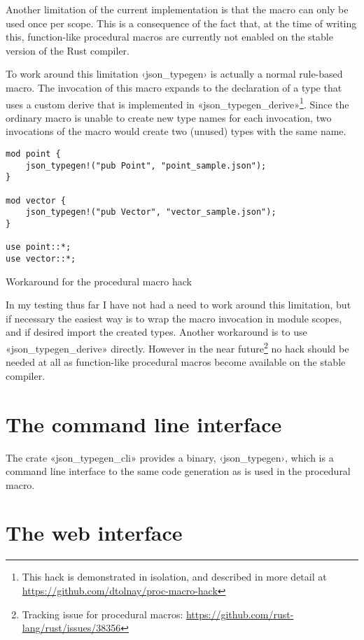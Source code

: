 Another limitation of the current implementation is that the macro can only be used once per scope. This is a consequence of the fact that, at the time of writing this, function-like procedural macros are currently not enabled on the stable version of the Rust compiler.

To work around this limitation ‹json_typegen› is actually a normal rule-based macro. The invocation of this macro expands to the declaration of a type that uses a custom derive that is implemented in «json_typegen_derive»\footnote{This hack is demonstrated in isolation, and described in more detail at \url{https://github.com/dtolnay/proc-macro-hack}}. Since the ordinary macro is unable to create new type names for each invocation, two invocations of the macro would create two (unused) types with the same name.

\begin{listing}[ht!]
\begin{verbatim}
mod point {
    json_typegen!("pub Point", "point_sample.json");
}

mod vector {
    json_typegen!("pub Vector", "vector_sample.json");
}

use point::*;
use vector::*;
\end{verbatim}
\caption{Workaround for the procedural macro hack}
\label{lst:hack-workaround}
\end{listing}

In my testing thus far I have not had a need to work around this limitation, but if necessary the easiest way is to wrap the macro invocation in module scopes, and if desired import the created types. Another workaround is to use «json_typegen_derive» directly. However in the near future\footnote{Tracking issue for procedural macros: \url{https://github.com/rust-lang/rust/issues/38356}} no hack should be needed at all as function-like procedural macros become available on the stable compiler.

\section{The command line interface}


The crate «json_typegen_cli» provides a binary, ‹json_typegen›, which is a command line interface to the same code generation as is used in the procedural macro.


\section{The web interface}

